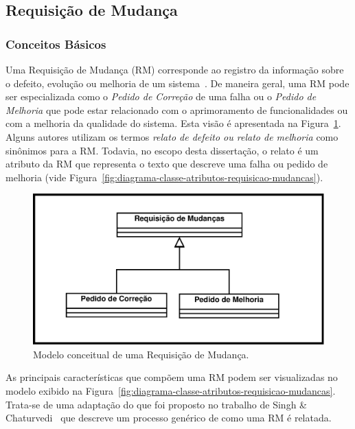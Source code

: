 \subsection{Requisição de Mudança}\label{sec:requisicao_de_mudanca}

\subsubsection{Conceitos Básicos}\label{subsec:tipos_de_requisicoes_mudanca}

Uma Requisição de Mudança (RM) corresponde ao registro da informação sobre o
defeito, evolução ou melhoria de um sistema~\cite{tripathy2014software}. De
maneira geral, uma RM pode ser especializada como o \textit{Pedido de Correção}
de uma falha ou o \textit{Pedido de Melhoria} que pode estar relacionado com o
aprimoramento de funcionalidades ou com a melhoria da qualidade do sistema. Esta
visão é apresentada na Figura~\ref{fig:diagrama-classe-requisicao-mudancas}.
Alguns autores utilizam os termos \textit{relato de defeito ou relato de
    melhoria} como sinônimos para a RM\@. Todavia, no escopo desta dissertação,
o relato é um atributo da RM que representa o texto que descreve uma falha ou
pedido de melhoria (vide
Figura~\ref{fig:diagrama-classe-atributos-requisicao-mudancas}).

\begin{figure}[htpb]
	\centering
	\includegraphics[width=0.5\linewidth]{./chapter-manutencao-software-visao-geral/img/diagrama-classe-conceitual-requisicao-mudancas.pdf}
	\caption{Modelo conceitual de uma Requisição de Mudança.}\label{fig:diagrama-classe-requisicao-mudancas}
\end{figure}

As principais características que compõem uma RM podem ser visualizadas no
modelo exibido na
Figura~\ref{fig:diagrama-classe-atributos-requisicao-mudancas}. Trata-se de uma
adaptação do que foi proposto no trabalho de Singh \&
Chaturvedi~\cite{singh2011bug} que descreve um processo genérico de como uma RM
é relatada.

